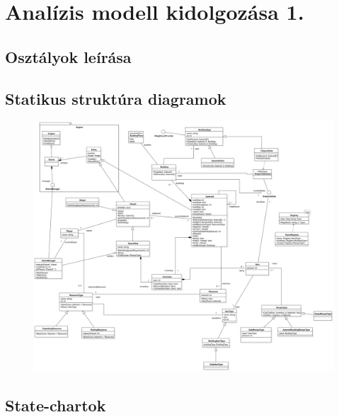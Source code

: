 \documentclass[../../projlab]{subfiles}
\begin{document}
\makeatletter


\makeatother

\chapter{Analízis modell kidolgozása 1.}


\section{Osztályok leírása}



\section{Statikus struktúra diagramok}

\begin{figure}[H]
	\includegraphics[width=1\textwidth]{docs/2_Project/svg/Design Model!Classes_1.png}
	\centering
\end{figure}



\section{State-chartok}
\end{document}
